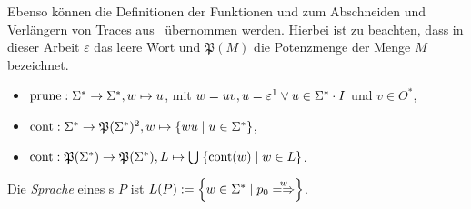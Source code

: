 Ebenso können die Definitionen der Funktionen \prune{} und \cont{} zum
Abschneiden und Verlängern von Traces aus~\cite{Schinko2016BA} übernommen
werden. Hierbei ist zu beachten, dass in dieser Arbeit $\varepsilon$ das leere
Wort und $\mathfrak{P}(M)$ die Potenzmenge der Menge $M$ bezeichnet.

\begin{Def}\mbox{}
  \begin{itemize}
    \item $\mathrm{prune}{}:\Sigma ^*\rightarrow\Sigma ^*, w\mapsto u$, mit $w=uv,
      u=\varepsilon\footnotemark\vee u\in\Sigma ^*\cdot I$ und $v\in O^*$,
    \item $\cont{}:\Sigma ^*\rightarrow\mathfrak{P}(\Sigma ^*)\footnotemark,
      w\mapsto\left\{wu\mid u\in\Sigma ^*\right\}$,
    \item $\mathrm{cont}{}:\mathfrak{P}(\Sigma ^*)\rightarrow\mathfrak{P}(\Sigma ^*),
      L\mapsto\bigcup\hspace{1pt}\left\{\mathrm{cont}{}(w)\mid w\in L\right\}$.
  \end{itemize}
\end{Def}

\begin{Def}[Sprache]
  \label{LDef}
  Die \emph{Sprache} eines \MEIO{}s $P$ ist $L(P) := \left\{w\in \Sigma ^* \mid
  p_0\weakmay[w]\right\}$.
\end{Def}
